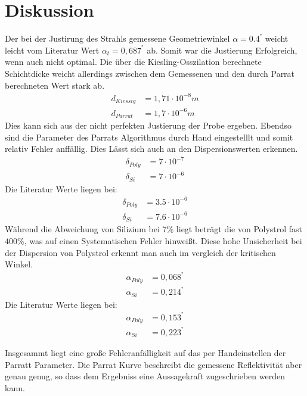 \section{Diskussion}
\label{sec:Diskussion}

Der bei der Justirung des Strahls gemessene Geometriewinkel $\alpha = 0.4^°$ weicht leicht vom Literatur Wert $\alpha_{t} = 0,687^°$ ab.
Somit war die Justierung Erfolgreich, wenn auch nicht optimal.
Die über die Kiesling-Osszilation berechnete Schichtdicke weicht allerdings zwischen dem Gemessenen 
und  den durch Parrat berechneten Wert stark ab.
\begin{align*}
    d_{Kiessig} &= 1,71 \cdot 10^{-8} m \\
    d_{Parrat} &= 1,7 \cdot 10^{-6} m
\end{align*}
Dies kann sich aus der nicht perfekten Justierung der Probe ergeben.
Ebendso sind die Parameter des Parrats Algorithmus durch Hand eingestelllt und somit relativ Fehler anffällig.
Dies Lässt sich auch an den Dispersionswerten erkennen.
\begin{align*}
    \delta_{Poly} &= 7 \cdot 10^{-7}  \\
    \delta_{Si} &= 7 \cdot 10^{-6} 
\end{align*}
Die Literatur Werte \cite{wert} liegen bei:
\begin{align*}
    \delta_{Poly} &= 3.5 \cdot 10^{-6}  \\
    \delta_{Si} &= 7.6 \cdot 10^{-6} 
\end{align*}
Während die Abweichung von Silizium bei $7\%$ liegt beträgt die von Polystrol fast $400\%$,
was auf einen Systematischen Fehler hinweißt.
Diese hohe Unsicherheit bei der Dispersion von Polystrol erkennt man auch im vergleich der kritischen Winkel.
\begin{align*}
    \alpha_{Poly} &= 0,068^°  \\
    \alpha_{Si} &= 0,214^°
\end{align*}
Die Literatur Werte \cite{wert} liegen bei:
\begin{align*}
    \alpha_{Poly} &= 0,153^°  \\
    \alpha_{Si} &= 0,223^°
\end{align*}

Insgesammt liegt eine große Fehleranfälligkeit auf das per Handeinstellen der Parratt Parameter.
Die Parrat Kurve beschreibt die gemessene Reflektivität aber genau genug, 
so dass dem Ergebniss eine Aussagekraft zugeschrieben werden kann.